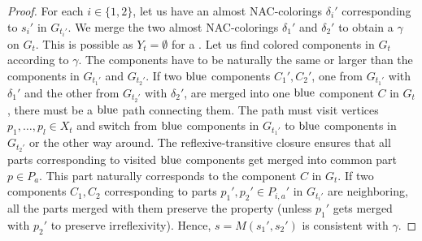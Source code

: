 %
\begin{proof}
	For each \( i \in \{1, 2\} \),
	let us have an almost NAC-colorings \( \delta_i' \) corresponding
	to \( s_i' \) in \( G_{t_i'} \).
	We merge the two almost NAC-colorings \( \delta_1' \) and \( \delta_2' \)
	to obtain a \rbcol{} \( \gamma \) on \( G_t \).
	This is possible as \( Y_t = \emptyset \) for a \JoinNode{}.
	Let us find colored components in \( G_t \) according to \(	\gamma \).
	The components have to be naturally the same or larger
	than the components in \( G_{t_1'} \) and \( G_{t_2'} \).
	If two \( \text{blue} \) components \( C_1', C_2' \),
	one from \( G_{t_1'} \) with \( \delta_1' \) and
	the other from \( G_{t_2'} \) with \( \delta_2' \),
	are merged into one \( \text{blue} \) component \( C \) in \( G_t \),
	there must be a \( \text{blue} \) path connecting them.
	The path must visit vertices \( p_1, \dots, p_l \in X_t \)
	and switch from \( \text{blue} \) components in \( G_{t_1'} \)
	to \( \text{blue} \) components in \( G_{t_2'} \) or the other way around.
	The reflexive-transitive closure ensures that
	all parts corresponding to visited \( \text{blue} \) components
	get merged into common part \( p \in P_a \).
	This part naturally corresponds to the component \( C \) in \( G_t \).
	If two components \( C_1, C_2 \) corresponding to
	parts \( p_1', p_2' \in P_{i,a}' \) in \( G_{t_i'} \) are neighboring,
	all the parts merged with them preserve the property
	(unless \( p_1' \) gets merged with \( p_2' \) to preserve irreflexivity).
	Hence, \( s = M(s_1', s_2') \) is consistent with \( \gamma \).
\end{proof}

